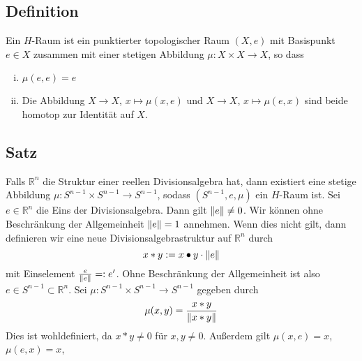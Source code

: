 \subsection{Definition} %
\label{sub:41}
Ein $H$-Raum ist ein punktierter topologischer Raum $(X,e)$ mit Basispunkt $e \in X$ zusammen mit einer stetigen Abbildung $\mu \colon X \times X \to X$, so dass 
\begin{enumerate}[(i)]
	\item $\mu(e,e)=e$
	\item Die Abbildung $X \to X$, $x \mapsto \mu(x,e)$ und $X \to X$, $x \mapsto \mu(e,x)$ sind beide homotop zur Identität auf $X$.
\end{enumerate}

\subsection{Satz} %
\label{sub:42}
Falls $\mathds{R}^n$ die Struktur einer reellen Divisionsalgebra hat, dann existiert eine stetige Abbildung $\mu \colon S^{n-1} \times S^{n-1} \to S^{n-1}$, sodass 
$(S^{n-1},e,\mu)$ ein $H$-Raum ist.
Sei $e \in \mathds{R}^n$ die Eins der Divisionsalgebra. Dann gilt $\norm{e}\not=0$. Wir können ohne Beschränkung der Allgemeinheit $\norm{e}=1 $ annehmen. Wenn dies nicht 
gilt, dann definieren wir eine neue Divisionsalgebrastruktur auf $\mathds{R}^n$ durch 
\[
	x * y := x \bullet y \cdot \norm{e} 
\]
mit Einselement $\frac{e}{\norm{e}} =: e'$. Ohne Beschränkung der Allgemeinheit ist also $e \in S^{n-1} \subset \mathds{R}^n$. Sei 
$\mu \colon S^{n-1} \times S^{n-1} \to S^{n-1}$ gegeben durch 
\[
	\mu(x,y) = \frac{x * y}{\norm{x * y} } 
\]
Dies ist wohldefiniert, da $x * y\not=0$ für $x,y \not=0$. Außerdem gilt $\mu(x,e)=x$, $\mu(e,x)=x$, \bewende

